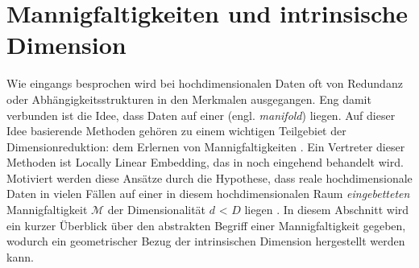 \section{Mannigfaltigkeiten und intrinsische Dimension}
\label{ch:Dimensionsreduktion:MannigfaltigkeitenIntrinsDim}

Wie eingangs besprochen wird bei hochdimensionalen Daten oft von Redundanz oder
Abhängigkeitsstrukturen in den Merkmalen ausgegangen. Eng damit verbunden ist die Idee, dass Daten
auf einer  (engl. \textit{manifold}) liegen. Auf dieser Idee basierende
Methoden gehören zu einem wichtigen Teilgebiet der Dimensionreduktion: dem Erlernen von
Mannigfaltigkeiten \parencite{Cayton.2005}. Ein Vertreter dieser Methoden ist Locally Linear Embedding, das in
 noch eingehend behandelt wird. Motiviert werden
diese Ansätze durch die Hypothese, dass reale hochdimensionale Daten in vielen Fällen auf einer in
diesem hochdimensionalen Raum \textit{eingebetteten} Mannigfaltigkeit $\mathcal{M}$ der
Dimensionalität $d$ < $D$ liegen \parencite[vgl.][1]{Cayton.2005}. In diesem Abschnitt wird ein kurzer Überblick über den abstrakten
Begriff einer Mannigfaltigkeit gegeben, wodurch ein geometrischer Bezug der intrinsischen Dimension
hergestellt werden kann.

